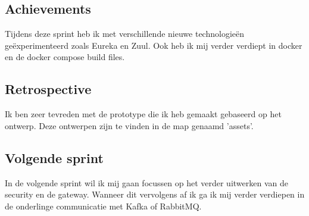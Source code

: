 \documentclass[11pt, twoside]{report}
\begin{document}
    \subsection{Achievements}\label{subsec:achievements-2}
    Tijdens deze sprint heb ik met verschillende nieuwe technologieën geëxperimenteerd zoals Eureka en Zuul.
    Ook heb ik mij verder verdiept in docker en de docker compose build files.

    \subsection{Retrospective}\label{subsec:retrospective-2}
    Ik ben zeer tevreden met de prototype die ik heb gemaakt gebaseerd op het ontwerp.
    Deze ontwerpen zijn te vinden in de map genaamd 'assets'.

    \subsection{Volgende sprint}\label{subsec:volgende-sprint-2}
    In de volgende sprint wil ik mij gaan focussen op het verder uitwerken van de security en de gateway.
    Wanneer dit vervolgens af ik ga ik mij verder verdiepen in de onderlinge communicatie met Kafka of RabbitMQ.
\end{document}
